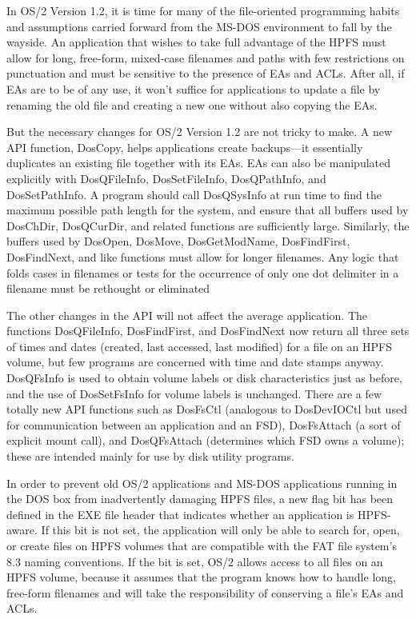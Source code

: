 In OS/2 Version 1.2, it is time for many of the file-oriented programming
habits and assumptions carried forward from the MS-DOS environment to fall by
the wayside. An application that wishes to take full advantage of the HPFS
must allow for long, free-form, mixed-case filenames and paths with few
restrictions on punctuation and must be sensitive to the presence of EAs and
ACLs.  After all, if EAs are to be of any use, it won't suffice for
applications to update a file by renaming the old file and creating a new one
without also copying the EAs.
 
But the necessary changes for OS/2 Version 1.2 are not tricky to make.  A new
API function, DosCopy, helps applications create backups---it essentially
duplicates an existing file together with its EAs.  EAs can also be
manipulated explicitly with DosQFileInfo, DosSetFileInfo, DosQPathInfo, and
DosSetPathInfo.  A program should call DosQSysInfo at run time to find the
maximum possible path length for the system, and ensure that all buffers used
by DosChDir, DosQCurDir, and related functions are sufficiently large.
Similarly, the buffers used by DosOpen, DosMove, DosGetModName,
DosFindFirst, DosFindNext, and like functions must allow for longer
filenames.  Any logic that folds cases in filenames or tests for the
occurrence of only one dot delimiter in a filename must be rethought or
eliminated
 
The other changes in the API will not affect the average application.  The
functions DosQFileInfo, DosFindFirst, and DosFindNext now return all three
sets of times and dates (created, last accessed, last modified) for a file on
an HPFS volume, but few programs are concerned with time and date stamps
anyway.  DosQFsInfo is used to obtain volume labels or disk characteristics
just as before, and the use of DosSetFsInfo for volume labels is unchanged.
There are a few totally new API functions such as DosFsCtl (analogous to
DosDevIOCtl but used for communication between an application and an FSD),
DosFsAttach (a sort of explicit mount call), and DosQFsAttach (determines
which FSD owns a volume); these are intended mainly for use by disk utility
programs.
 
In order to prevent old OS/2 applications and MS-DOS applications running in
the DOS box from inadvertently damaging HPFS files, a new flag bit has been
defined in the EXE file header that indicates whether an application is
HPFS-aware.  If this bit is not set, the application will only be able to
search for, open, or create files on HPFS volumes that are compatible with
the FAT file system's 8.3 naming conventions.  If the bit is set, OS/2 allows
access to all files on an HPFS volume, because it assumes that the program
knows how to handle long, free-form filenames and will take the
responsibility of conserving a file's EAs and ACLs.
 
